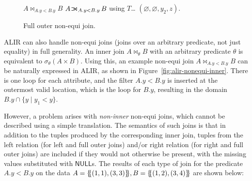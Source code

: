 \documentclass[acmsmall,screen,nonacm]{acmart}\settopmatter{printfolios=true,printccs=false,printacmref=false}
\newcommand*{\lB}{\{\mskip-5mu\{}
\newcommand*{\rB}{\}\mskip-5mu\}}
\newcommand*{\ojoinbars}{\rule[0.05ex]{.25em}{.6pt}\llap{\rule[1.0ex]{.25em}{.6pt}}}
\DeclareMathOperator*{\ljoin}{\ojoinbars\mkern-6.8mu\Join}
\DeclareMathOperator*{\ijoin}{\Join}
\newcommand*{\NULL}{\textsf{NULL}}
\newcommand*{\dups}{\textsf{dups}}
\begin{document}
\begin{figure}
\begin{minipage}[b]{0.3\textwidth}
\begin{algorithmic}
                \State $A \ijoin_{A.y < B.y} B$
            \ALIRIn
                \State $A \ljoin_{A.y < B.y} B$ using $T$\dots
                        \ALIRFor{$\dups \in B$}
                            \State $(\varnothing, \varnothing, y_2, z).$
                        \EndALIRFor
                    \EndALIRFor
                \EndALIRFor
            \EndALIRLet
        \end{algorithmic}
        \vspace{-1em}
        \caption{\label{fig:alir-nonequi-outer}
            Full outer non-equi join.
        }
        \vspace{-1em}
    \end{minipage}
\end{figure}
ALIR can also handle non-equi joins (joins over an arbitrary predicate, not just equality) in full generality.
An inner join $A \ijoin_\theta B$ with an arbitrary predicate $\theta$ is equivalent to
$\sigma_\theta(A \times B)$. Using this, an example non-equi join
$ A \ijoin_{A.y < B.y} B $
can be naturally expressed in ALIR, as shown in Figure~\ref{fig:alir-nonequi-inner}. There is one loop for each attribute, and the filter $A.y < B.y$ is inserted at the outermost valid location, which is the loop for $B.y$, resulting in the domain $B.y \cap \{ y \mid y_1 < y \}$.

However, a problem arises with \emph{non-inner} non-equi joins,
which cannot be described using a simple translation. The semantics of such joins is that
in addition to the tuples produced by the corresponding inner join,
tuples from the left relation (for left and full outer joins)
and/or right relation (for right and full outer joins)
are included if they would not otherwise be present,
with the missing values substituted with $\NULL$s.
The results of each type of join for the predicate $A.y < B.y$ on the data $A = \lB (1, 1), (3, 3) \rB, B = \lB (1, 2), (3, 4) \rB$ are shown below:
\end{document}

